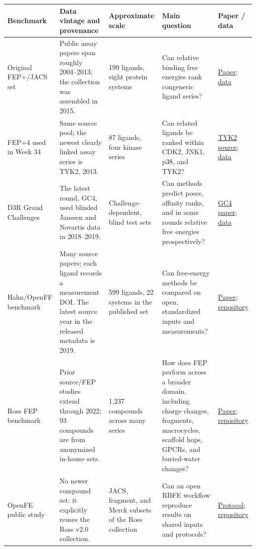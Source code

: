 \documentclass[11pt]{article}
\begin{document}
\begin{table}[H]
\centering
\scriptsize
\begin{tabular}{L{0.13\textwidth}L{0.21\textwidth}L{0.13\textwidth}L{0.28\textwidth}L{0.15\textwidth}}
\toprule
Benchmark & Data vintage and provenance & Approximate scale & Main question & Paper / data \\
\midrule
Original FEP+/JACS set & Public assay papers span roughly 2004--2013; the collection was assembled in 2015. & 199 ligands, eight protein systems & Can relative binding free energies rank congeneric ligand series? & \href{https://doi.org/10.1021/ja512751q}{Paper}; \href{https://github.com/schrodinger/public_binding_free_energy_benchmark}{data} \\
FEP+4 used in Week 34 & Same source pool; the newest clearly linked assay series is TYK2, 2013. & 87 ligands, four kinase series & Can related ligands be ranked within CDK2, JNK1, p38, and TYK2? & \href{https://doi.org/10.1016/j.ejmech.2013.03.070}{TYK2 source}; \href{https://github.com/schrodinger/public_binding_free_energy_benchmark}{data} \\
D3R Grand Challenges & The latest round, GC4, used blinded Janssen and Novartis data in 2018--2019. & Challenge-dependent, blind test sets & Can methods predict poses, affinity ranks, and in some rounds relative free energies prospectively? & \href{https://doi.org/10.1007/s10822-020-00289-y}{GC4 paper}; \href{https://drugdesigndata.org/about/datasets}{data} \\
Hahn/OpenFF benchmark & Many source papers; each ligand records a measurement DOI. The latest source year in the released metadata is 2019. & 599 ligands, 22 systems in the published set & Can free-energy methods be compared on open, standardized inputs and measurements? & \href{https://doi.org/10.33011/livecoms.4.1.1497}{Paper}; \href{https://github.com/openforcefield/protein-ligand-benchmark}{repository} \\
Ross FEP benchmark & Prior source/FEP studies extend through 2022; 93 compounds are from anonymized in-house sets. & 1,237 compounds across many series & How does FEP perform across a broader domain, including charge changes, fragments, macrocycles, scaffold hops, GPCRs, and buried-water changes? & \href{https://doi.org/10.1038/s42004-023-01019-9}{Paper}; \href{https://github.com/schrodinger/public_binding_free_energy_benchmark}{repository} \\
OpenFE public study & No newer compound set: it explicitly reuses the Ross v2.0 collection. & JACS, fragment, and Merck subsets of the Ross collection & Can an open RBFE workflow reproduce results on shared inputs and protocols? & \href{https://industrybenchmarks2024.readthedocs.io/en/latest/public/overview.html}{Protocol}; \href{https://github.com/OpenFreeEnergy/IndustryBenchmarks2024}{repository} \\

\end{tabular}
\end{table}
\end{document}
